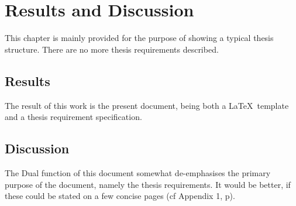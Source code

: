 \chapter{Results and Discussion}\label{ch:results}

This chapter is mainly provided for the purpose of showing a typical thesis
structure.  There are no more thesis requirements described.

\section{Results}

The result of this work is the present document, being both a \LaTeX\
template and a thesis requirement specification.

\section{Discussion}

The Dual function of this document somewhat de-emphasises the primary
purpose of the document, namely the thesis requirements.  It would be
better, if these could be stated on a few concise pages (cf Appendix
1, p\pageref{app1}).
